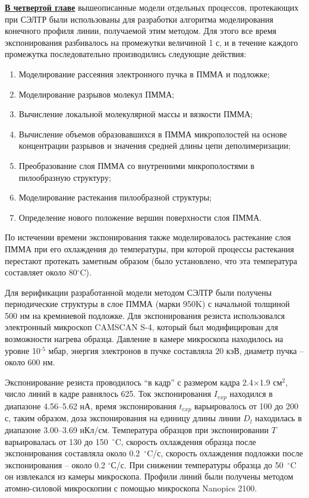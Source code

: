 \underline{\textbf{В четвертой главе}} вышеописанные модели отдельных процессов, протекающих при СЭЛТР были использованы для разработки алгоритма моделирования конечного профиля линии, получаемой этим методом. Для этого все время экспонирования разбивалось на промежутки величиной 1 с, и в течение каждого промежутка последовательно производились следующие действия:
\begin{enumerate}
	\item Моделирование рассеяния электронного пучка в ПММА и подложке;
	\item Моделирование разрывов молекул ПММА;
	\item Вычисление локальной молекулярной массы и вязкости ПММА;
	\item Вычисление объемов образовавшихся в ПММА микрополостей на основе концентрации разрывов и значения средней длины цепи деполимеризации;
	\item Преобразование слоя ПММА со внутренними микрополостями в пилообразную структуру;
	\item Моделирование растекания пилообразной структуры;
	\item Определение нового положение вершин поверхности слоя ПММА.
\end{enumerate}

По истечении времени экспонирования также моделировалось растекание слоя ПММА при его охлаждения до температуры, при которой процессы растекания перестают протекать заметным образом (было установлено, что эта температура составляет около 80$^\circ$C).

Для верификации разработанной модели методом СЭЛТР были получены периодические структуры в слое ПММА (марки 950K) с начальной толщиной 500 нм на кремниевой подложке. Для экспонирования резиста использовался электронный микроскоп CAMSCAN S-4, который был модифицирован для возможности нагрева образца. Давление в камере микроскопа находилось на уровне 10$^{\text{-5}}$ мбар, энергия электронов в пучке составляла 20 кэВ, диаметр пучка -- около 600 нм.

Экспонирование резиста проводилось ``в кадр'' с размером кадра 2.4$\times$1.9 см$^\text{2}$, число линий в кадре равнялось 625. Ток экспонирования $I_{exp}$ находился в диапазоне 4.56--5.62 нА, время экспонирования $t_{exp}$ варьировалось от 100 до 200 с, таким образом, доза экспонирования на единицу длины линии $D_l$ находилась в диапазоне 3.00--3.69 нКл/см. Температура образцов при экспонировании $T$ варьировалась от 130 до 150~$^\circ$C, скорость охлаждения образца после экспонирования составляла около 0.2~$^\circ$C/с, скорость охлаждения подложки после экспонирования -- около 0.2 $^\circ$С/с. При снижении температуры образца до 50~$^\circ$C он извлекался из камеры микроскопа. Профили линий были получены методом атомно-силовой микроскопии с помощью микроскопа Nanopics 2100.

